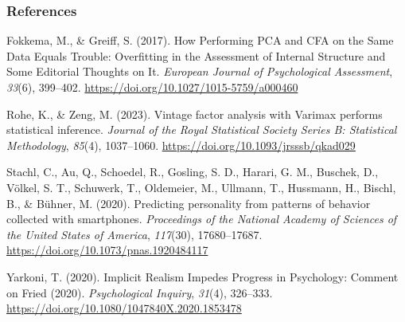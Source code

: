 \documentclass[
  jou,
  longtable,
  colorlinks=true,linkcolor=blue,citecolor=blue,urlcolor=blue]{apa7}
\newlength{\cslhangindent}
\newenvironment{CSLReferences}[2] %
 {\begin{list}{}{%
  \setlength{\itemindent}{0pt}
  \setlength{\leftmargin}{0pt}
  \setlength{\parsep}{0pt}
  \ifodd #1
   \setlength{\leftmargin}{\cslhangindent}
   \setlength{\itemindent}{-1\cslhangindent}
  \fi
  \setlength{\itemsep}{#2\baselineskip}}}
 {\end{list}}
\begin{document}
\subsubsection{References}\label{references}

\label{refs}
\begin{CSLReferences}{1}{0}
Fokkema, M., \& Greiff, S. (2017). How {Performing} {PCA} and {CFA} on
the {Same} {Data} {Equals} {Trouble}: {Overfitting} in the {Assessment}
of {Internal} {Structure} and {Some} {Editorial} {Thoughts} on {It}.
\emph{European Journal of Psychological Assessment}, \emph{33}(6),
399--402. \url{https://doi.org/10.1027/1015-5759/a000460}

Rohe, K., \& Zeng, M. (2023). {Vintage factor analysis with Varimax
performs statistical inference}. \emph{Journal of the Royal Statistical
Society Series B: Statistical Methodology}, \emph{85}(4), 1037--1060.
\url{https://doi.org/10.1093/jrsssb/qkad029}

Stachl, C., Au, Q., Schoedel, R., Gosling, S. D., Harari, G. M.,
Buschek, D., Völkel, S. T., Schuwerk, T., Oldemeier, M., Ullmann, T.,
Hussmann, H., Bischl, B., \& Bühner, M. (2020). Predicting personality
from patterns of behavior collected with smartphones. \emph{Proceedings
of the National Academy of Sciences of the United States of America},
\emph{117}(30), 17680--17687.
\url{https://doi.org/10.1073/pnas.1920484117}

Yarkoni, T. (2020). Implicit {Realism} {Impedes} {Progress} in
{Psychology}: {Comment} on {Fried} (2020). \emph{Psychological Inquiry},
\emph{31}(4), 326--333.
\url{https://doi.org/10.1080/1047840X.2020.1853478}

\end{CSLReferences}
\end{document}
